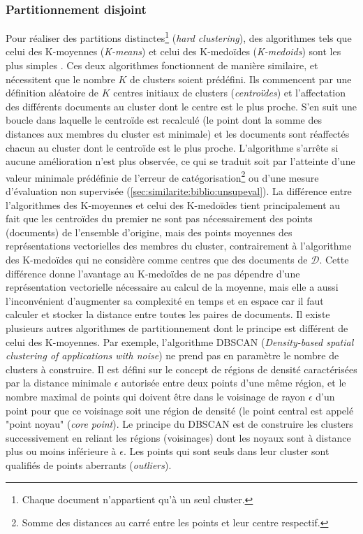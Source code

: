 \subsubsection{Partitionnement disjoint}
Pour réaliser des partitions distinctes\footnote{Chaque document n'appartient qu'à un seul cluster.} (\textit{hard clustering}), des algorithmes tels que celui des K-moyennes (\textit{K-means}) \citep{forgey1965kmeans} et celui des K-medoïdes (\textit{K-medoids}) \citep{kaufman1987kmedoids} sont les plus simples \citep{balabantaray2015KmeansKmedoids}. Ces deux algorithmes fonctionnent de manière similaire, et nécessitent que le nombre $K$ de clusters soient prédéfini. Ils commencent par une définition aléatoire de $K$ centres initiaux de clusters (\textit{centroïdes}) et l'affectation des différents documents au cluster dont le centre est le plus proche. S'en suit une boucle dans laquelle le centroïde est recalculé (le point dont la somme des distances aux membres du cluster est minimale) et les documents sont réaffectés chacun au cluster dont le centroïde est le plus proche. L'algorithme s'arrête si aucune amélioration n'est plus observée, ce qui se traduit soit par l'atteinte d'une valeur minimale prédéfinie de l'erreur de catégorisation\footnote{Somme des distances au carré entre les points et leur centre respectif.} ou d'une mesure d'évaluation non supervisée (\ref{sec:similarite:biblio:unsupeval}). La différence entre l'algorithmes des K-moyennes et celui des K-medoïdes tient principalement au fait que les centroïdes du premier ne sont pas nécessairement des points (documents) de l'ensemble d'origine, mais des points moyennes des représentations vectorielles des membres du cluster, contrairement à l'algorithme des K-medoïdes qui ne considère comme centres que des documents de $\mathcal{D}$. Cette différence donne l'avantage au K-medoïdes de ne pas dépendre d'une représentation vectorielle nécessaire au calcul de la moyenne, mais elle a aussi l'inconvénient d'augmenter sa complexité en temps et en espace car il faut calculer et stocker la distance entre toutes les paires de documents. Il existe plusieurs autres algorithmes de partitionnement dont le principe est différent de celui des K-moyennes. Par exemple, l'algorithme DBSCAN (\textit{Density-based spatial clustering of applications with noise}) \citep{ester1996dbscan}  ne prend pas en paramètre le nombre de clusters à construire. Il est défini sur le concept de régions de densité caractérisées par la distance minimale $\epsilon$ autorisée entre deux points d'une même région, et le nombre maximal de points qui doivent être dans le voisinage de rayon $\epsilon$ d'un point pour que ce voisinage soit une région de densité (le point central est appelé "point noyau" (\textit{core point}). Le principe du DBSCAN est de construire les clusters successivement en reliant les régions (voisinages) dont les noyaux sont à distance plus ou moins inférieure à $\epsilon$. Les points qui sont seuls dans leur cluster sont qualifiés de points aberrants (\textit{outliers}). 

